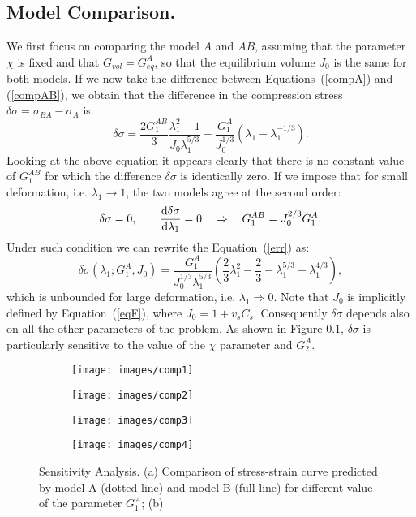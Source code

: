 \subsection{Model Comparison.}
We first focus on comparing the model $A$ and $AB$, assuming that the parameter $\chi$ is fixed and that $G_{vol}=G^A_{eq}$, so that the equilibrium volume $J_0$ is the same for both models. If we now take the difference between Equations~(\ref{compA}) and (\ref{compAB}), we obtain that the difference in the compression stress $\delta \sigma= \sigma_{BA}-\sigma_{A}$ is:
\begin{equation}
\delta \sigma = \frac{2 G_1^{AB}}{3} \frac{\lambda_1^2-1}{J_0\lambda_1^{5/3}} - \frac{G_1^A}{J_0^{1/3}}(\lambda_1-\lambda_1^{-1/3}).\label{err}
\end{equation}
Looking at the above equation it appears clearly that there is no constant value of $G^{AB}_1$ for which the difference $\delta \sigma$ is identically zero. If we impose that for small deformation, i.e. $\lambda_1\rightarrow 1$, the two models agree at the second order:
\begin{equation}
\delta \sigma=0, \qquad \frac{\text{d} \delta \sigma}{\text{d} \lambda_1}=0 \quad\Rightarrow \quad G_1^{AB} = J_0^{2/3}G_1^A.
\end{equation}
Under such condition we can rewrite the Equation~(\ref{err}) as:
\begin{equation}
\delta \sigma(\lambda_1;G^A_1,J_0) = \frac{G_1^A}{J^{1/3}_0\lambda_1^{5/3}} \left(\frac{2}{3}\lambda^2_1-\frac{2}{3}-\lambda_1^{5/3}+\lambda_1^{4/3}\right), 
\end{equation}
which is unbounded for large deformation, i.e. $\lambda_1\Rightarrow0$. Note that $J_0$ is implicitly defined by Equation~(\ref{eqF}), where $J_0=1+v_sC_s$. Consequently $\delta\sigma$ depends also on all the other parameters of the problem. As shown in Figure \ref{}, $\delta \sigma$ is particularly sensitive to the value of the $\chi$ parameter and $G^A_2$. 
\begin{figure}
	\begin{subfigure}{0.49\textwidth}
		\texttt{[image: images/comp1]}
		\caption{}
	\end{subfigure}
	\begin{subfigure}{0.49\textwidth}
		\texttt{[image: images/comp2]}
		\caption{}
	\end{subfigure}

	\begin{subfigure}{0.49\textwidth}
	\texttt{[image: images/comp3]}
	\caption{}
	\end{subfigure}
	\begin{subfigure}{0.49\textwidth}
	\texttt{[image: images/comp4]}
	\caption{}
	\end{subfigure}
\caption{Sensitivity Analysis. (a) Comparison of stress-strain curve predicted by model A (dotted line) and model B (full line) for different value of the parameter $G^A_1$; (b) }
\end{figure}
